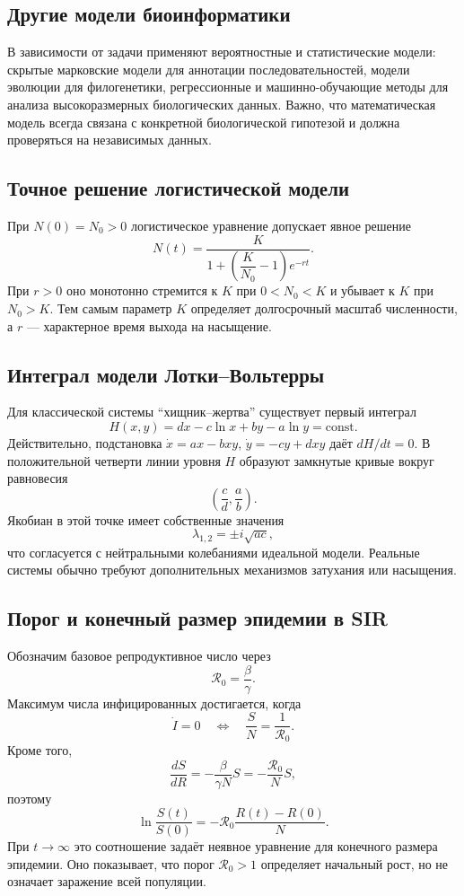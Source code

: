 \subsection{Другие модели биоинформатики}

В зависимости от задачи применяют вероятностные и статистические модели:
скрытые марковские модели для аннотации последовательностей, модели
эволюции для филогенетики, регрессионные и машинно-обучающие методы для
анализа высокоразмерных биологических данных. Важно, что математическая
модель всегда связана с конкретной биологической гипотезой и должна
проверяться на независимых данных.


\subsection{Точное решение логистической модели}

При $N(0)=N_0>0$ логистическое уравнение допускает явное решение
\[
    \boxed{
    N(t)=\frac{K}{1+\left(\dfrac{K}{N_0}-1\right)e^{-rt}}.
    }
\]
При $r>0$ оно монотонно стремится к $K$ при $0<N_0<K$ и убывает к $K$ при
$N_0>K$. Тем самым параметр $K$ определяет долгосрочный масштаб численности, а
$r$ --- характерное время выхода на насыщение.

\subsection{Интеграл модели Лотки--Вольтерры}

Для классической системы ``хищник--жертва'' существует первый интеграл
\[
    \boxed{
    H(x,y)=d x-c\ln x+b y-a\ln y=\text{const}.
    }
\]
Действительно, подстановка $\dot x=ax-bxy$, $\dot y=-cy+dxy$ даёт
$dH/dt=0$. В положительной четверти линии уровня $H$ образуют замкнутые кривые
вокруг равновесия
\[
    \left(\frac cd,\frac ab\right).
\]
Якобиан в этой точке имеет собственные значения
\[
    \lambda_{1,2}=\pm i\sqrt{ac},
\]
что согласуется с нейтральными колебаниями идеальной модели. Реальные системы
обычно требуют дополнительных механизмов затухания или насыщения.

\subsection{Порог и конечный размер эпидемии в SIR}

Обозначим базовое репродуктивное число через
\[
    \mathcal R_0=\frac{\beta}{\gamma}.
\]
Максимум числа инфицированных достигается, когда
\[
    \dot I=0
    \quad\Longleftrightarrow\quad
    \frac{S}{N}=\frac1{\mathcal R_0}.
\]
Кроме того,
\[
    \frac{dS}{dR}
    =-\frac{\beta}{\gamma N}S
    =-\frac{\mathcal R_0}{N}S,
\]
поэтому
\[
    \ln\frac{S(t)}{S(0)}
    =-\mathcal R_0\frac{R(t)-R(0)}{N}.
\]
При $t\to\infty$ это соотношение задаёт неявное уравнение для конечного размера
эпидемии. Оно показывает, что порог $\mathcal R_0>1$ определяет начальный рост,
но не означает заражение всей популяции.

